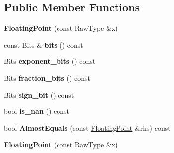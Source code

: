 \subsection*{Public Member Functions}
\begin{DoxyCompactItemize}
\item 
\hypertarget{classtesting_1_1internal_1_1_floating_point_a0dabf840863e0df84046f171c891fe71}{}{\bfseries Floating\+Point} (const Raw\+Type \&x)\label{classtesting_1_1internal_1_1_floating_point_a0dabf840863e0df84046f171c891fe71}

\item 
\hypertarget{classtesting_1_1internal_1_1_floating_point_abead51f16ec6ea84360a976da1cd1387}{}const Bits \& {\bfseries bits} () const \label{classtesting_1_1internal_1_1_floating_point_abead51f16ec6ea84360a976da1cd1387}

\item 
\hypertarget{classtesting_1_1internal_1_1_floating_point_af53c50b85408c582540d6244c026ce2b}{}Bits {\bfseries exponent\+\_\+bits} () const \label{classtesting_1_1internal_1_1_floating_point_af53c50b85408c582540d6244c026ce2b}

\item 
\hypertarget{classtesting_1_1internal_1_1_floating_point_aa0167b7b10a934b743ba3c1f47421e63}{}Bits {\bfseries fraction\+\_\+bits} () const \label{classtesting_1_1internal_1_1_floating_point_aa0167b7b10a934b743ba3c1f47421e63}

\item 
\hypertarget{classtesting_1_1internal_1_1_floating_point_a6176cc4d443724477f2799bcbd9f020a}{}Bits {\bfseries sign\+\_\+bit} () const \label{classtesting_1_1internal_1_1_floating_point_a6176cc4d443724477f2799bcbd9f020a}

\item 
\hypertarget{classtesting_1_1internal_1_1_floating_point_aaef2fd2cd8cdf791206a5e9fed8ef90d}{}bool {\bfseries is\+\_\+nan} () const \label{classtesting_1_1internal_1_1_floating_point_aaef2fd2cd8cdf791206a5e9fed8ef90d}

\item 
\hypertarget{classtesting_1_1internal_1_1_floating_point_adb0fe9ab1d9e5288f8e5550234211166}{}bool {\bfseries Almost\+Equals} (const \hyperlink{classtesting_1_1internal_1_1_floating_point}{Floating\+Point} \&rhs) const \label{classtesting_1_1internal_1_1_floating_point_adb0fe9ab1d9e5288f8e5550234211166}

\item 
\hypertarget{classtesting_1_1internal_1_1_floating_point_a0dabf840863e0df84046f171c891fe71}{}{\bfseries Floating\+Point} (const Raw\+Type \&x)\label{classtesting_1_1internal_1_1_floating_point_a0dabf840863e0df84046f171c891fe71}


\end{DoxyCompactItemize}
